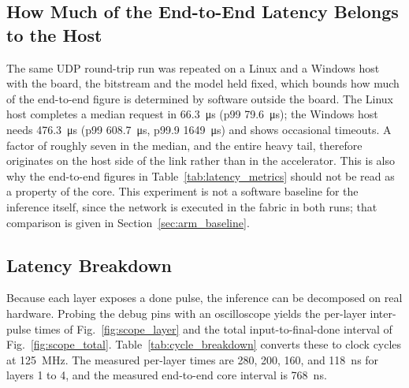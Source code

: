 \documentclass[final,5p,times,twocolumn]{elsarticle}
\begin{document}
\subsection{How Much of the End-to-End Latency Belongs to the Host}
\label{sec:osbaseline}
The same UDP round-trip run was repeated on a Linux and a Windows host with the
board, the bitstream and the model held fixed, which bounds how much of the
end-to-end figure is determined by software outside the board. The Linux host
completes a median request in \SI{66.3}{\micro\second} (p99
\SI{79.6}{\micro\second}); the Windows host needs \SI{476.3}{\micro\second} (p99
\SI{608.7}{\micro\second}, p99.9 \SI{1649}{\micro\second}) and shows occasional
timeouts. A factor of roughly seven in the median, and the entire heavy tail,
therefore originates on the host side of the link rather than in the
accelerator. This is also why the end-to-end figures in
Table~\ref{tab:latency_metrics} should not be read as a property of the core.
This experiment is not a software baseline for the inference itself, since the
network is executed in the fabric in both runs; that comparison is given in
Section~\ref{sec:arm_baseline}.

\subsection{Latency Breakdown}
Because each layer exposes a done pulse, the inference can be decomposed on real
hardware. Probing the debug pins with an oscilloscope yields the per-layer
inter-pulse times of Fig.~\ref{fig:scope_layer} and the total
input-to-final-done interval of Fig.~\ref{fig:scope_total}.
Table~\ref{tab:cycle_breakdown} converts these to clock cycles at
\SI{125}{\mega\hertz}. The measured per-layer times are 280, 200, 160,
and \SI{118}{\nano\second} for layers 1 to 4, and the measured end-to-end core
interval is \SI{768}{\nano\second}.
\end{document}
